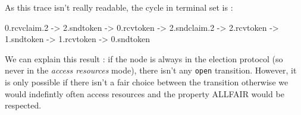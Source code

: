 \documentclass{article}
\begin{document}
As this trace isn't really readable, the cycle in terminal set is : \newline

0.rcvclaim.2
-> 2.sndtoken
-> 0.rcvtoken
-> 2.sndclaim.2
-> 2.rcvtoken
-> 1.sndtoken
-> 1.rcvtoken
-> 0.sndtoken

We can explain this result : if the node is always in the election protocol (so never in the \textit{access resources} mode), there isn't any \verb#open# transition. However, it is only possible if there isn't a fair choice between the transition otherwise we would indefintly often access resources and the property ALLFAIR would be respected.
\end{document}
